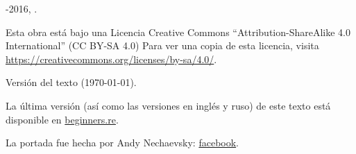 ﻿\begin{titlepage}


\end{titlepage}

\newpage

\begin{center}
\vspace*{\fill}
{\LARGE \TITLE}

\vspace*{\fill}

{\large \AUTHOR}

{\large \TT{<\EMAIL>}}
\vspace*{\fill}
\vfill

\ccbysa

-2016, \AUTHOR. 

Esta obra est\'a bajo una Licencia Creative Commons ``Attribution-ShareAlike 4.0 International'' (CC BY-SA 4.0)
Para ver una copia de esta licencia, visita \url{https://creativecommons.org/licenses/by-sa/4.0/}.

Versi\'on del texto ({\large \today}).

La \'ultima versi\'on (as\'i como las versiones en ingl\'es y ruso) de este texto est\'a disponible en
\href{http://go.yurichev.com/17009}{beginners.re}.

La portada fue hecha por Andy Nechaevsky: \href{http://go.yurichev.com/17023}{facebook}.

\end{center}

